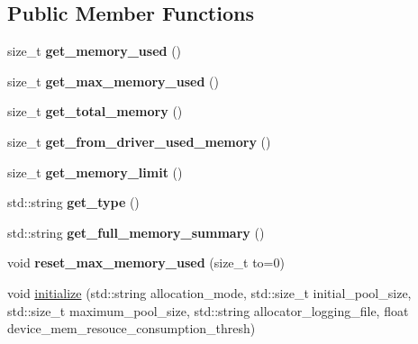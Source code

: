 \subsection*{Public Member Functions}
\begin{DoxyCompactItemize}
\item 
\mbox{\label{classblazing__device__memory__resource_ae6a57a18e3a02583bb111a273d9b9467}} 
size\+\_\+t {\bfseries get\+\_\+memory\+\_\+used} ()
\item 
\mbox{\label{classblazing__device__memory__resource_aeacacda54cf9cc89b2f1bb30ad54a77d}} 
size\+\_\+t {\bfseries get\+\_\+max\+\_\+memory\+\_\+used} ()
\item 
\mbox{\label{classblazing__device__memory__resource_a34c81aa0fe6a5d542573739a187264bb}} 
size\+\_\+t {\bfseries get\+\_\+total\+\_\+memory} ()
\item 
\mbox{\label{classblazing__device__memory__resource_ac64dc046686ed83b8f6b0f85cd79517e}} 
size\+\_\+t {\bfseries get\+\_\+from\+\_\+driver\+\_\+used\+\_\+memory} ()
\item 
\mbox{\label{classblazing__device__memory__resource_a0d0e8280d74b19fdfbab855b790c872e}} 
size\+\_\+t {\bfseries get\+\_\+memory\+\_\+limit} ()
\item 
\mbox{\label{classblazing__device__memory__resource_adcd21d872aad1620305edc061145d882}} 
std\+::string {\bfseries get\+\_\+type} ()
\item 
\mbox{\label{classblazing__device__memory__resource_ac80188ecfe926a72194b98e2ad7f61e0}} 
std\+::string {\bfseries get\+\_\+full\+\_\+memory\+\_\+summary} ()
\item 
\mbox{\label{classblazing__device__memory__resource_a3d5d3b2e31f50b773e36c5b5516144c6}} 
void {\bfseries reset\+\_\+max\+\_\+memory\+\_\+used} (size\+\_\+t to=0)
\item 
void \hyperlink{classblazing__device__memory__resource_aff09e3f24d6448da5176747dbb37aa6b}{initialize} (std\+::string allocation\+\_\+mode, std\+::size\+\_\+t initial\+\_\+pool\+\_\+size, std\+::size\+\_\+t maximum\+\_\+pool\+\_\+size, std\+::string allocator\+\_\+logging\+\_\+file, float device\+\_\+mem\+\_\+resouce\+\_\+consumption\+\_\+thresh)

\end{DoxyCompactItemize}
